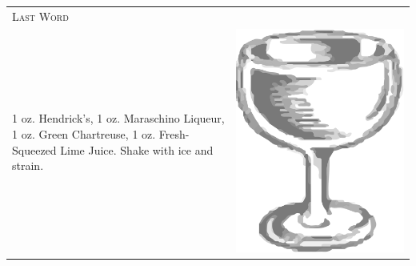 \documentclass{article}
\begin{document}
\begin{tabular}{p{2in} p{0.5in}}
	  \multicolumn{2}{p{3in}}{\centering\Huge\textsc{Last Word}} \\ 
	    \vspace{-0.1in}1 oz. Hendrick's, 1 oz. Maraschino Liqueur, 1 oz. Green Chartreuse, 1 oz. Fresh-Squeezed Lime Juice. Shake with ice and strain. &
	    \vspace{-0.1in} \includegraphics{coupe.png}
\end{tabular}
\end{document}
